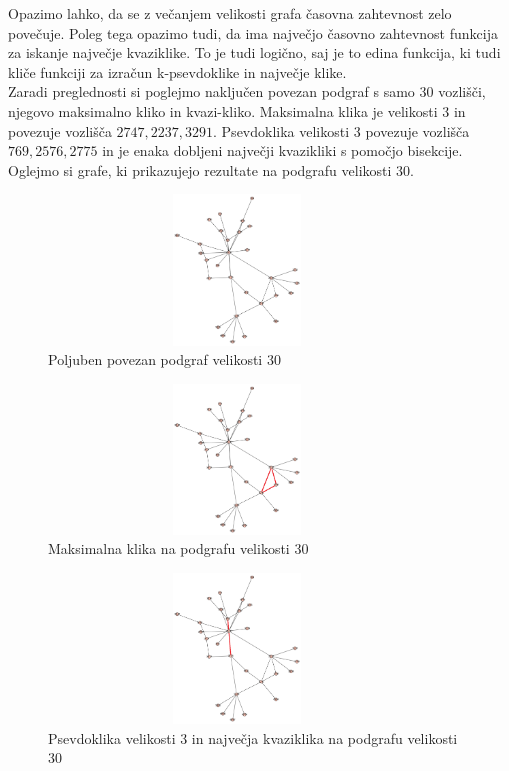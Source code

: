 \documentclass[12pt,a4paper]{amsart}
\theoremstyle{definition}
\theoremstyle{plain}
\begin{document}
Opazimo lahko, da se z večanjem velikosti grafa časovna zahtevnost zelo povečuje. Poleg tega opazimo tudi, da ima največjo časovno zahtevnost funkcija za iskanje največje kvaziklike. To je tudi logično, saj je to edina funkcija, ki tudi kliče funkciji za izračun k-psevdoklike in največje klike.
\\

Zaradi preglednosti si poglejmo naključen povezan podgraf s samo $30$ vozlišči, njegovo maksimalno kliko in kvazi-kliko.
Maksimalna klika je velikosti $3$ in povezuje vozlišča $2747, 2237, 3291$. Psevdoklika velikosti 3 povezuje vozlišča $769, 2576, 2775$ in je enaka dobljeni največji kvazikliki s pomočjo bisekcije. Oglejmo si grafe, ki prikazujejo rezultate na podgrafu velikosti 30.\\

\begin{figure}[h]
\caption{Poljuben povezan podgraf velikosti 30}
\centering
\includegraphics[width=10cm, height=4cm]{klika}
\end{figure}

\begin{figure}[h]
\caption{Maksimalna klika na podgrafu velikosti 30}
\centering
\includegraphics[width=10cm, height=4cm]{max_klika}
\end{figure}

\begin{figure}[h]
\caption{Psevdoklika velikosti 3 in največja kvaziklika na podgrafu velikosti 30}
\centering
\includegraphics[width=10cm, height=4cm]{psevdoklika}
\end{figure}
\end{document}
